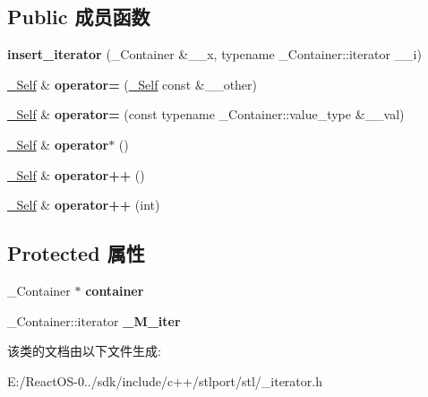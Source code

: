 \subsection*{Public 成员函数}
\begin{DoxyCompactItemize}
\item 
\mbox{\label{classinsert__iterator_afcec0d224e7d7ad2e949d86940347607}} 
{\bfseries insert\+\_\+iterator} (\+\_\+\+Container \&\+\_\+\+\_\+x, typename \+\_\+\+Container\+::iterator \+\_\+\+\_\+i)
\item 
\mbox{\label{classinsert__iterator_a66c1c9390787373bd98ddc90d856815c}} 
\hyperlink{classinsert__iterator}{\+\_\+\+Self} \& {\bfseries operator=} (\hyperlink{classinsert__iterator}{\+\_\+\+Self} const \&\+\_\+\+\_\+other)
\item 
\mbox{\label{classinsert__iterator_a19c09ae7538e7a92a6128698001eacdb}} 
\hyperlink{classinsert__iterator}{\+\_\+\+Self} \& {\bfseries operator=} (const typename \+\_\+\+Container\+::value\+\_\+type \&\+\_\+\+\_\+val)
\item 
\mbox{\label{classinsert__iterator_aada6dac233e7f716f5c2a2fd4f5b3dc9}} 
\hyperlink{classinsert__iterator}{\+\_\+\+Self} \& {\bfseries operator$\ast$} ()
\item 
\mbox{\label{classinsert__iterator_a96488d161edae3f96233a9c410d881ec}} 
\hyperlink{classinsert__iterator}{\+\_\+\+Self} \& {\bfseries operator++} ()
\item 
\mbox{\label{classinsert__iterator_a3a87f3cd517d1954524847491cc0c16b}} 
\hyperlink{classinsert__iterator}{\+\_\+\+Self} \& {\bfseries operator++} (int)
\end{DoxyCompactItemize}
\subsection*{Protected 属性}
\begin{DoxyCompactItemize}
\item 
\mbox{\label{classinsert__iterator_ac1b72a17b3e3833a263d4ef89b11e911}} 
\+\_\+\+Container $\ast$ {\bfseries container}
\item 
\mbox{\label{classinsert__iterator_ae2b5f589c2d7bcfa46e12769e9b91b66}} 
\+\_\+\+Container\+::iterator {\bfseries \+\_\+\+M\+\_\+iter}
\end{DoxyCompactItemize}


该类的文档由以下文件生成\+:\begin{DoxyCompactItemize}
\item 
E\+:/\+React\+O\+S-\/0../sdk/include/c++/stlport/stl/\+\_\+iterator.\+h\end{DoxyCompactItemize}
